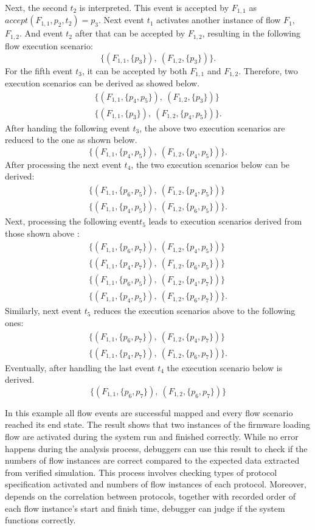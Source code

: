 \documentclass[12pt,frontmatter,copyright,thesis]{usfmanus}
\begin{document}
Next, the second $t_2$ is interpreted. This event is accepted by
$F_{1,1}$ as $\mathit{accept}(F_{1,1}, {p_2}, t_2) = p_3$.
Next event $t_1$ activates another instance of flow $F_1$, $F_{1,2}$. 
And event $t_2$
 after that can be accepted by $F_{1,2}$, resulting in
the following flow execution scenario:
\[
	\{(F_{1,1}, \{p_3\}),~(F_{1,2}, \{p_3\})\}.
\]
For the fifth event $t_3$, it can be accepted by both $F_{1,1}$ 
and $F_{1,2}$. Therefore,
two execution scenarios can be derived as showed below.
\[
\begin{array}{l}
	\{(F_{1,1}, \{p_4, p_5\}),~(F_{1,2}, \{p_3\})\} \\
	\{(F_{1,1}, \{p_3\}),~(F_{1,2}, \{p_4, p_5\})\}.
\end{array}
\]
After handing the following event $t_3$, the above two execution scenarios
are reduced to the one as shown below.
\[
	\{(F_{1,1}, \{p_4, p_5\}),~(F_{1,2}, \{p_4, p_5\})\}.
\]
After processing the next event $t_4$, the two execution scenarios below
can be derived:
\[
\begin{array}{l}
	\{(F_{1,1}, \{p_6, p_5\}),~(F_{1,2}, \{p_4, p_5\})\} \\
	\{(F_{1,1}, \{p_4, p_5\}),~(F_{1,2}, \{p_6, p_5\})\}.
\end{array}
\]
Next, processing the following event$t_5$ leads to execution scenarios derived 
from those shown above :
\[
\begin{array}{l}
	\{(F_{1,1}, \{p_6, p_7\}),~(F_{1,2}, \{p_4, p_5\})\} \\
	\{(F_{1,1}, \{p_4, p_7\}),~(F_{1,2}, \{p_6, p_5\})\}\\
	\{(F_{1,1}, \{p_6, p_5\}),~(F_{1,2}, \{p_4, p_7\})\} \\
	\{(F_{1,1}, \{p_4, p_5\}),~(F_{1,2}, \{p_6, p_7\})\}.
\end{array}
\]
Similarly, next event $t_5$ reduces the execution scenarios above to the following ones:
\begin{equation}
 \label{eq:2}
 \begin{split}
	\{(F_{1,1}, \{p_6, p_7\}),~(F_{1,2}, \{p_4, p_7\})\} \\
	\{(F_{1,1}, \{p_4, p_7\}),~(F_{1,2}, \{p_6, p_7\})\}.
\end{split}
\end{equation} 
Eventually, after handling the last event $t_4$ the execution scenario below is
derived.
\[
	\{(F_{1,1}, \{p_6, p_7\}),~(F_{1,2}, \{p_6, p_7\})\}
\]

In this example all flow events are successful mapped and every flow scenario reached its
end state. The result shows that
two instances of the firmware loading flow
are activated during the system run
and finished correctly. While no error happens
during the analysis process, debuggers
can use this
result to check if the numbers of flow instances are
correct compared to the expected data
extracted from verified simulation.
This process involves checking types of
protocol specification activated and
numbers of flow instances of each protocol.
Moreover, depends on the correlation between
protocols, together with recorded order of each flow instance's
start and finish time, debugger can judge if
the system functions correctly. 
\end{document}
